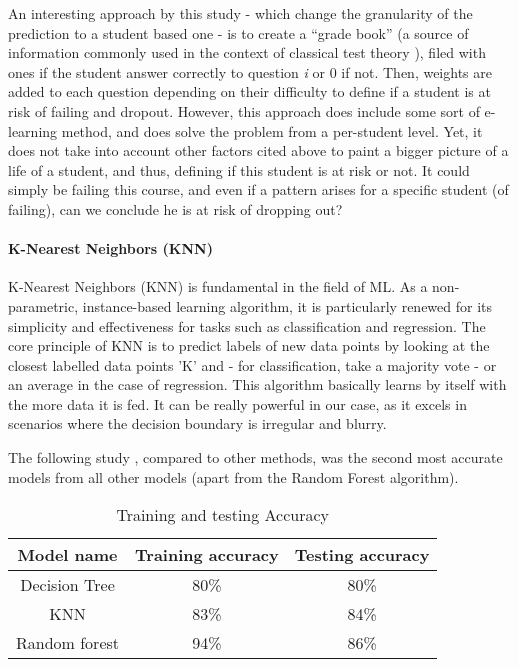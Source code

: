 An interesting approach by this study \cite{lan_sparse_2014} - which change the granularity of the prediction to a student based one - is to create a “grade book” (a source of information commonly used in the context of classical test theory \cite{novick_axioms_1966}), filed with ones if the student answer correctly to question \textit{i} or 0 if not. Then, weights are added to each question depending on their difficulty to define if a student is at risk of failing and dropout. However, this approach does include some sort of e-learning method, and does solve the problem from a per-student level. Yet, it does not take into account other factors cited above to paint a bigger picture of a life of a student, and thus, defining if this student is at risk or not. It could simply be failing this course, and even if a pattern arises for a specific student (of failing), can we conclude he is at risk of dropping out?

\vspace{8pt}
\paragraph{K-Nearest Neighbors (KNN)}
K-Nearest Neighbors (KNN) is fundamental in the field of ML. As a non-parametric, instance-based learning algorithm, it is particularly renewed for its simplicity and effectiveness for tasks such as classification and regression.
The core principle of KNN is to predict labels of new data points by looking at the closest labelled data points 'K' and - for classification, take a majority vote - or an average in the case of regression. This algorithm basically learns by itself with the more data it is fed.
It can be really powerful in our case, as it excels in scenarios where the decision boundary is irregular and blurry.

The following study \cite{shiful_machine_2021}, compared to other methods, was the second most accurate models from all other models (apart from the Random Forest algorithm).
\begin{table}[H]
    \centering
    \caption{Training and testing Accuracy\cite{shiful_machine_2021}}
    \begin{tabular}{|c|c|c|}
        \hline
        \textbf{Model name} & \textbf{Training accuracy}  & \textbf{Testing accuracy}\\
        \hline
        Decision Tree & 80\% & 80\% \\
        \hline
        KNN & 83\% & 84\% \\
        \hline
        Random forest & 94\% & 86\% \\
        \hline
    \end{tabular}
    \label{tab:training_testing_acc_shiful}
\end{table}

